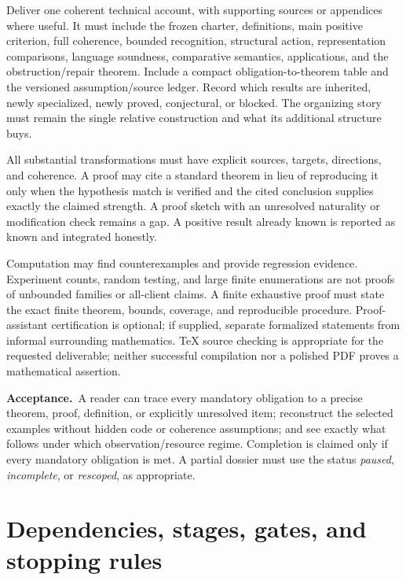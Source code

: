 \documentclass[11pt,a4paper]{article}
\newcommand{\accept}{\par\textbf{Acceptance.}\ }
\begin{document}
Deliver one coherent technical account, with supporting sources or appendices
where useful. It must include the frozen charter, definitions, main positive
criterion, full coherence, bounded recognition, structural action,
representation comparisons, language soundness, comparative semantics,
applications, and the obstruction/repair theorem. Include a compact
obligation-to-theorem table and the versioned assumption/source ledger.
Record which results are inherited, newly specialized, newly proved,
conjectural, or blocked. The organizing story must remain the single relative
construction and what its additional structure buys.

All substantial transformations must have explicit sources, targets,
directions, and coherence. A proof may cite a standard theorem in lieu of
reproducing it only when the hypothesis match is verified and the cited
conclusion supplies exactly the claimed strength. A proof sketch with an
unresolved naturality or modification check remains a gap. A positive result
already known is reported as known and integrated honestly.

Computation may find counterexamples and provide regression evidence.
Experiment counts, random testing, and large finite enumerations are not
proofs of unbounded families or all-client claims. A finite exhaustive proof
must state the exact finite theorem, bounds, coverage, and reproducible
procedure. Proof-assistant certification is optional; if supplied, separate
formalized statements from informal surrounding mathematics. TeX source
checking is appropriate for the requested deliverable; neither successful
compilation nor a polished PDF proves a mathematical assertion.

\accept A reader can trace every mandatory obligation to a precise theorem,
proof, definition, or explicitly unresolved item; reconstruct the selected
examples without hidden code or coherence assumptions; and see exactly
what follows under which observation/resource regime. Completion is claimed
only if every mandatory obligation is met. A partial dossier must use the
status \emph{paused}, \emph{incomplete}, or \emph{rescoped}, as appropriate.

\section{Dependencies, stages, gates, and stopping rules}\label{sec:gates}
\end{document}
